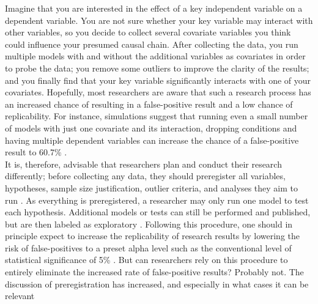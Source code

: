 Imagine that you are interested in the effect of a key independent variable on a dependent variable. You are not sure whether your key variable may interact with other variables, so you decide to collect several covariate variables you think could influence your presumed causal chain. After collecting the data, you run multiple models with and without the additional variables as covariates in order to probe the data; you remove some outliers to improve the clarity of the results; and you finally find that your key variable significantly interacts with one of your covariates. Hopefully, most researchers are aware that such a research process has an increased chance of resulting in a false-positive result and a low chance of replicability. For instance, simulations suggest that running even a small number of models with just one covariate and its interaction, dropping conditions and having multiple dependent variables can increase the chance of a false-positive result to 60.7\% \citep{Simmons2011}.\\

It is, therefore, advisable that researchers plan and conduct their research differently; before collecting any data, they should preregister all variables, hypotheses, sample size justification, outlier criteria, and analyses they aim to run \citep{VANTVEER20162}. As everything is preregistered, a researcher may only run one model to test each hypothesis. Additional models or tests can still be performed and published, but are then labeled as exploratory \citep{Nosek2018}. Following this procedure, one should in principle expect to increase the replicability of research results by lowering the risk of false-positives to a preset alpha level such as the conventional level of statistical significance of 5\% \citep{Moore2016}. But can researchers rely on this procedure to entirely eliminate the increased rate of false-positive results? Probably not. The discussion of preregistration has increased, and especially in what cases it can be relevant \citep{Pham2020,Simmons2020} \\

